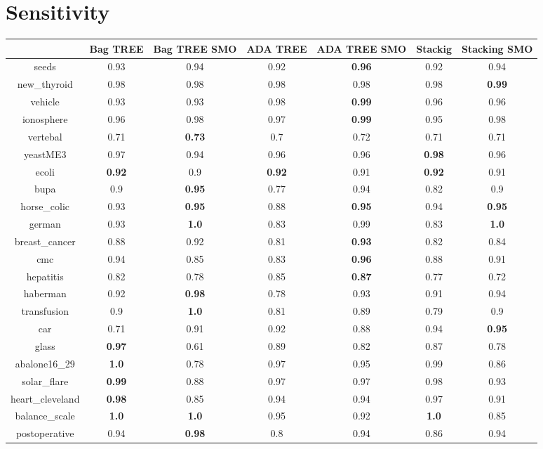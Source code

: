 \documentclass{article}%
\begin{document}
%
\section*{Sensitivity}%
\begin{tabular}{c|cccccc}%
&Bag TREE&Bag TREE SMO&ADA TREE&ADA TREE SMO&Stackig&Stacking SMO\\%
\hline%
seeds&0.93&0.94&0.92&\textbf{0.96}&0.92&0.94\\%
new\_thyroid&0.98&0.98&0.98&0.98&0.98&\textbf{0.99}\\%
vehicle&0.93&0.93&0.98&\textbf{0.99}&0.96&0.96\\%
ionosphere&0.96&0.98&0.97&\textbf{0.99}&0.95&0.98\\%
vertebal&0.71&\textbf{0.73}&0.7&0.72&0.71&0.71\\%
yeastME3&0.97&0.94&0.96&0.96&\textbf{0.98}&0.96\\%
ecoli&\textbf{0.92}&0.9&\textbf{0.92}&0.91&\textbf{0.92}&0.91\\%
bupa&0.9&\textbf{0.95}&0.77&0.94&0.82&0.9\\%
horse\_colic&0.93&\textbf{0.95}&0.88&\textbf{0.95}&0.94&\textbf{0.95}\\%
german&0.93&\textbf{1.0}&0.83&0.99&0.83&\textbf{1.0}\\%
breast\_cancer&0.88&0.92&0.81&\textbf{0.93}&0.82&0.84\\%
cmc&0.94&0.85&0.83&\textbf{0.96}&0.88&0.91\\%
hepatitis&0.82&0.78&0.85&\textbf{0.87}&0.77&0.72\\%
haberman&0.92&\textbf{0.98}&0.78&0.93&0.91&0.94\\%
transfusion&0.9&\textbf{1.0}&0.81&0.89&0.79&0.9\\%
car&0.71&0.91&0.92&0.88&0.94&\textbf{0.95}\\%
glass&\textbf{0.97}&0.61&0.89&0.82&0.87&0.78\\%
abalone16\_29&\textbf{1.0}&0.78&0.97&0.95&0.99&0.86\\%
solar\_flare&\textbf{0.99}&0.88&0.97&0.97&0.98&0.93\\%
heart\_cleveland&\textbf{0.98}&0.85&0.94&0.94&0.97&0.91\\%
balance\_scale&\textbf{1.0}&\textbf{1.0}&0.95&0.92&\textbf{1.0}&0.85\\%
postoperative&0.94&\textbf{0.98}&0.8&0.94&0.86&0.94\\%
\end{tabular}

%
\end{document}
